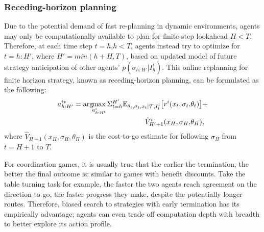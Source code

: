 \documentclass[letterpaper, 10 pt, conference]{ieeeconf}  %
\newcommand{\argmax}{\arg\!\!\max}
\begin{document}
\subsubsection{Receding-horizon planning}\label{sec:receding}
Due to the potential demand of fast re-planning in dynamic environments, 
agents may only be computationally available to plan for finite-step lookahead $H<T$.
Therefore, at each time step $t=h$,$h<T$, agents instead try to optimize
for $t=h:H'$, where $H'=min(h+H,T)$, based on updated model of future strategy 
anticipation of other agents' $p(\sigma_{h:H'}|I^i_h)$. This online replanning 
for finite horizon strategy, known as receding-horizon planning, can be formulated as the following:
\begin{equation}
  \begin{aligned}
  a^{i*}_{h:H'} = \argmax_{a^i_{h:H'}} 
  \Sigma_{t=h}^{H'} 
  \mathbb{E}_{\theta_t,\sigma_{t},x_t|\mathcal{T},I^i_t} \big{[}
    r^i(x_t,\sigma_t,&\theta_t)\big{]}+ \\
    \hat{V}^i_{H'+1}(x_H,\sigma_H,&\theta_H), 
  \end{aligned}
  \end{equation}
where $\hat{V}_{H+1}(x_H,\sigma_H,\theta_H)$ is the cost-to-go estimate for 
following $\sigma_H$ from $t=H+1$ to $T$.

For coordination games, it is usually true that the earlier the termination, 
the better the final outcome is: similar to games with benefit discounts. Take 
the table turning task for example, the faster the two agents 
reach agreement on the direction to go, the faster progress they make, despite 
the potentially longer routes. Therefore, biased search to 
strategies with early termination has its empirically advantage; agents 
can even trade off computation depth with breadth to better explore its action profile. 
\end{document}
